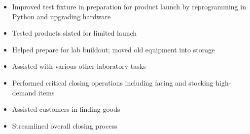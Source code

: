 \documentclass[10pt,letterpaper,withhyper]{altacv}
\begin{document}

\begin{fullwidth}

\makecvheader

\end{fullwidth}



\medskip



\begin{itemize}
    \item Improved test fixture in preparation for product launch by reprogramming in Python and upgrading hardware
    \item Tested products slated for limited launch
    \item Helped prepare for lab buildout; moved old equipment into storage
    \item Assisted with various other laboratory tasks
\end{itemize}

\medskip

\begin{itemize}
    \item Performed critical closing operations including facing and stocking high-demand items
    \item Assisted customers in finding goods
    \item Streamlined overall closing process
\end{itemize}
\end{document}
